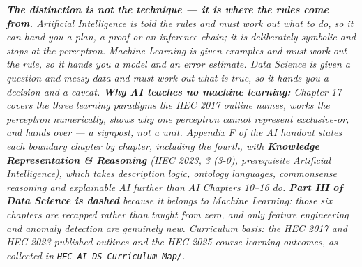 \documentclass[11pt]{article}
\begin{document}
{\fontsize{6.3}{7.6}\selectfont\itshape\color{gray!72!black}%
\textbf{The distinction is not the technique --- it is where the rules come from.}
\emph{Artificial Intelligence} is \emph{told} the rules and must work out what to do,
so it can hand you a plan, a proof or an inference chain; it is deliberately symbolic
and stops at the perceptron. \emph{Machine Learning} is given examples and must work
out the rule, so it hands you a model and an error estimate. \emph{Data Science} is
given a question and messy data and must work out what is true, so it hands you a
decision and a caveat.
\textbf{Why AI teaches no machine learning:} Chapter 17 covers the three learning
paradigms the HEC 2017 outline names, works the perceptron numerically, shows why one
perceptron cannot represent exclusive-or, and hands over --- a signpost, not a unit.
Appendix F of the AI handout states each boundary chapter by chapter, including the
fourth, with \textbf{Knowledge Representation \& Reasoning} (HEC 2023, 3 (3-0),
prerequisite Artificial Intelligence), which takes description logic, ontology
languages, commonsense reasoning and explainable AI further than AI Chapters 10--16
do. \textbf{Part III of Data Science is dashed} because it belongs to Machine
Learning: those six chapters are recapped rather than taught from zero, and only
feature engineering and anomaly detection are genuinely new. Curriculum basis: the HEC
2017 and HEC 2023 published outlines and the HEC 2025 course learning outcomes, as
collected in \texttt{HEC AI-DS Curriculum Map/}.\par}
\end{document}
